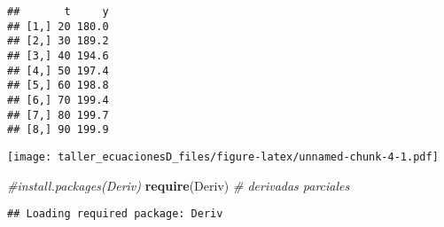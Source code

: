 \documentclass[]{article}
\newenvironment{Shaded}{\begin{snugshade}}{\end{snugshade}}
\newcommand{\KeywordTok}[1]{\textcolor[rgb]{0.13,0.29,0.53}{\textbf{#1}}}
\newcommand{\CommentTok}[1]{\textcolor[rgb]{0.56,0.35,0.01}{\textit{#1}}}
\newcommand{\NormalTok}[1]{#1}
\begin{document}
\begin{verbatim}
##       t     y
## [1,] 20 180.0
## [2,] 30 189.2
## [3,] 40 194.6
## [4,] 50 197.4
## [5,] 60 198.8
## [6,] 70 199.4
## [7,] 80 199.7
## [8,] 90 199.9
\end{verbatim}

\texttt{[image: taller\_ecuacionesD\_files/figure-latex/unnamed-chunk-4-1.pdf]}

\begin{Shaded}
\begin{Highlighting}[]
\CommentTok{#install.packages(Deriv)}
\KeywordTok{require}\NormalTok{(Deriv) }\CommentTok{# derivadas parciales}
\end{Highlighting}
\end{Shaded}

\begin{verbatim}
## Loading required package: Deriv
\end{verbatim}
\end{document}
